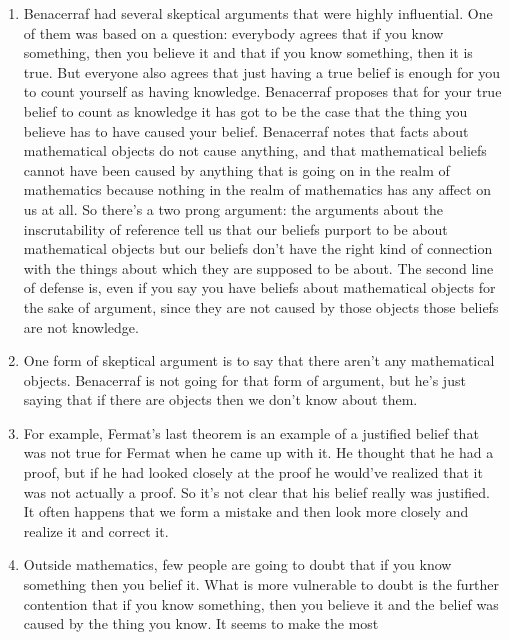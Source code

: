 \documentclass[12pt]{article}
\theoremstyle{definition}
\begin{document}
\begin{enumerate}
    \itemsep0em 
    \item
        Benacerraf had several skeptical arguments that were highly
        influential. One of them was based on a question: everybody agrees that
        if you know something, then you believe it and that if you know
        something, then it is true. But everyone also agrees that just having a
        true belief is enough for you to count yourself as having knowledge.
        Benacerraf proposes that for your true belief to count as knowledge it
        has got to be the case that the thing you believe has to have caused
        your belief. Benacerraf notes that facts about mathematical objects do
        not cause anything, and that mathematical beliefs cannot have been
        caused by anything that is going on in the realm of mathematics because
        nothing in the realm of mathematics has any affect on us at all. So
        there's a two prong argument: the arguments about the inscrutability of
        reference tell us that our beliefs purport to be about mathematical
        objects but our beliefs don't have the right kind of connection with
        the things about which they are supposed to be about. The second line
        of defense is, even if you say you have beliefs about mathematical
        objects for the sake of argument, since they are not caused by those
        objects those beliefs are not knowledge.
    \item
        One form of skeptical argument is to say that there aren't any
        mathematical objects. Benacerraf is not going for that form of
        argument, but he's just saying that if there are objects then we don't
        know about them.
    \item
        For example, Fermat's last theorem is an example of a justified belief
        that was not true for Fermat when he came up with it. He thought that
        he had a proof, but if he had looked closely at the proof he would've
        realized that it was not actually a proof. So it's not clear that his
        belief really was justified. It often happens that we form a mistake
        and then look more closely and realize it and correct it.
    \item
        Outside mathematics, few people are going to doubt that if you know
        something then you belief it. What is more vulnerable to doubt is the
        further contention that if you know something, then you believe it and
        the belief was caused by the thing you know. It seems to make the most

\end{enumerate}
\end{document}

